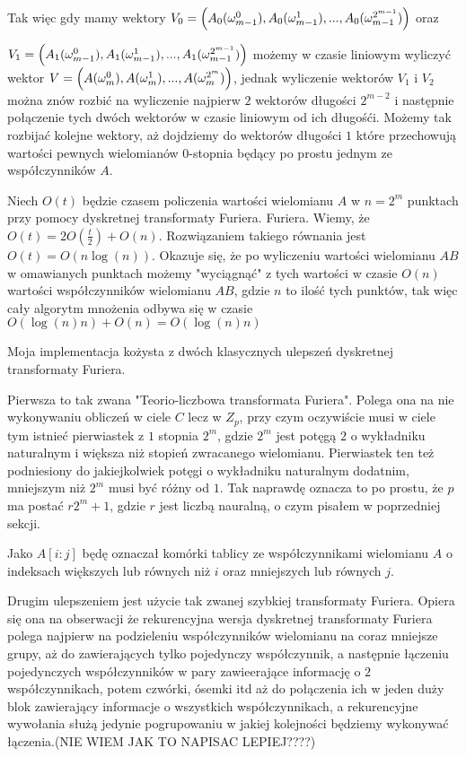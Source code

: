 \documentclass{article}
\begin{document}
Tak więc gdy mamy wektory $V_0=\Bigl( A_0(\omega_{m-1}^0),A_0(\omega_{m-1}^1),...,A_0(\omega_{m-1}^{2^{m-1}})\Bigr)$ oraz                          

$V_1=\Bigl( A_1(\omega_{m-1}^0),A_1(\omega_{m-1}^1),...,A_1(\omega_{m-1}^{2^{m-1}})\Bigr)$ możemy
w czasie liniowym wyliczyć wektor $V=\Bigl( A(\omega_{m}^0),A(\omega_{m}^1),...,A(\omega_{m}^{2^{m}})\Bigr)$, jednak wyliczenie wektorów 
$V_1$ i $V_2$ można znów rozbić na wyliczenie najpierw $2$ wektorów długości $2^{m-2}$ i 
następnie połączenie tych dwóch wektorów w czasie liniowym od ich długośći. Możemy tak rozbijać kolejne wektory, aż dojdziemy do wektorów długości
$1$ które przechowują wartości pewnych wielomianów $0$-stopnia będący po prostu jednym ze współczynników $A$.

Niech $O(t)$ będzie czasem policzenia wartości wielomianu $A$ w $n=2^m$ punktach przy pomocy dyskretnej transformaty Furiera. 
Furiera. Wiemy, że $O(t)=2O(\frac{t}{2})+O(n)$. Rozwiązaniem takiego równania jest $O(t)=O(n\log(n))$.
Okazuje się, że po wyliczeniu wartości wielomianu $AB$ w omawianych punktach możemy "wyciągnąć" z tych wartości w czasie
$O(n)$ wartości współczynników wielomianu $AB$, gdzie $n$ to ilość tych punktów, tak więc cały algorytm mnożenia odbywa się w czasie $O(\log(n)n)+O(n)=O(\log(n)n)$

Moja implementacja kożysta z dwóch klasycznych ulepszeń dyskretnej transformaty Furiera. 

Pierwsza to tak zwana "Teorio-liczbowa transformata Furiera". Polega ona na nie wykonywaniu obliczeń w ciele $C$ lecz
w $Z_p$, przy czym oczywiście musi w ciele tym istnieć pierwiastek z $1$ stopnia $2^m$, gdzie $2^m$ jest potęgą $2$ o wykładniku
naturalnym i większa niż stopień zwracanego wielomianu. Pierwiastek ten też podniesiony do jakiejkolwiek potęgi 
o wykładniku naturalnym dodatnim, mniejszym niż $2^m$ musi być różny od $1$. 
Tak naprawdę oznacza to po prostu, że $p$ ma postać $r2^m+1$, gdzie $r$ jest liczbą nauralną, o czym pisałem w poprzedniej 
sekcji.

Jako $A[i:j]$ będę oznaczał komórki tablicy ze współczynnikami wielomianu $A$ o indeksach większych lub równych niż $i$ oraz mniejszych lub równych $j$. 


Drugim ulepszeniem jest użycie tak zwanej szybkiej transformaty Furiera. Opiera się ona na obserwacji że rekurencyjna wersja dyskretnej transformaty Furiera 
polega najpierw na podzieleniu współczynników wielomianu na coraz mniejsze grupy, aż do zawierających tylko pojedynczy współczynnik, a następnie łączeniu pojedynczych współczynników
w pary zawieerające informację o $2$ współczynnikach, potem czwórki, ósemki itd aż do połączenia ich w jeden duży blok zawierający informacje o wszystkich współczynnikach, a rekurencyjne wywołania służą jedynie 
pogrupowaniu w jakiej kolejności będziemy wykonywać łączenia.(NIE WIEM JAK TO NAPISAC LEPIEJ????)
\end{document}
